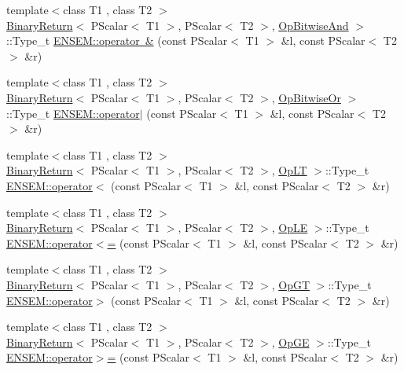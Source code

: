 \begin{DoxyCompactItemize}
\item 
{\footnotesize template$<$class T1 , class T2 $>$ }\\\mbox{\hyperlink{structBinaryReturn}{Binary\+Return}}$<$ P\+Scalar$<$ T1 $>$, P\+Scalar$<$ T2 $>$, \mbox{\hyperlink{structOpBitwiseAnd}{Op\+Bitwise\+And}} $>$\+::Type\+\_\+t \mbox{\hyperlink{group__primscalar_gadbbb42ee94a77c2df59c5a4cf78fddeb}{E\+N\+S\+E\+M\+::operator \&}} (const P\+Scalar$<$ T1 $>$ \&l, const P\+Scalar$<$ T2 $>$ \&r)
\item 
{\footnotesize template$<$class T1 , class T2 $>$ }\\\mbox{\hyperlink{structBinaryReturn}{Binary\+Return}}$<$ P\+Scalar$<$ T1 $>$, P\+Scalar$<$ T2 $>$, \mbox{\hyperlink{structOpBitwiseOr}{Op\+Bitwise\+Or}} $>$\+::Type\+\_\+t \mbox{\hyperlink{group__primscalar_ga246529f971eca0fda63267c9a68a51f7}{E\+N\+S\+E\+M\+::operator$\vert$}} (const P\+Scalar$<$ T1 $>$ \&l, const P\+Scalar$<$ T2 $>$ \&r)
\item 
{\footnotesize template$<$class T1 , class T2 $>$ }\\\mbox{\hyperlink{structBinaryReturn}{Binary\+Return}}$<$ P\+Scalar$<$ T1 $>$, P\+Scalar$<$ T2 $>$, \mbox{\hyperlink{structOpLT}{Op\+LT}} $>$\+::Type\+\_\+t \mbox{\hyperlink{group__primscalar_ga898f0000029c1749bdd5a60160848adb}{E\+N\+S\+E\+M\+::operator$<$}} (const P\+Scalar$<$ T1 $>$ \&l, const P\+Scalar$<$ T2 $>$ \&r)
\item 
{\footnotesize template$<$class T1 , class T2 $>$ }\\\mbox{\hyperlink{structBinaryReturn}{Binary\+Return}}$<$ P\+Scalar$<$ T1 $>$, P\+Scalar$<$ T2 $>$, \mbox{\hyperlink{structOpLE}{Op\+LE}} $>$\+::Type\+\_\+t \mbox{\hyperlink{group__primscalar_gadc72d49cf80f5b61a37c029861a74a5f}{E\+N\+S\+E\+M\+::operator$<$=}} (const P\+Scalar$<$ T1 $>$ \&l, const P\+Scalar$<$ T2 $>$ \&r)
\item 
{\footnotesize template$<$class T1 , class T2 $>$ }\\\mbox{\hyperlink{structBinaryReturn}{Binary\+Return}}$<$ P\+Scalar$<$ T1 $>$, P\+Scalar$<$ T2 $>$, \mbox{\hyperlink{structOpGT}{Op\+GT}} $>$\+::Type\+\_\+t \mbox{\hyperlink{group__primscalar_gac4bbd6e76f1d5dfb8c50417f131c43a0}{E\+N\+S\+E\+M\+::operator$>$}} (const P\+Scalar$<$ T1 $>$ \&l, const P\+Scalar$<$ T2 $>$ \&r)
\item 
{\footnotesize template$<$class T1 , class T2 $>$ }\\\mbox{\hyperlink{structBinaryReturn}{Binary\+Return}}$<$ P\+Scalar$<$ T1 $>$, P\+Scalar$<$ T2 $>$, \mbox{\hyperlink{structOpGE}{Op\+GE}} $>$\+::Type\+\_\+t \mbox{\hyperlink{group__primscalar_ga149cf6b2bcbe466aae6c6e90ee265c50}{E\+N\+S\+E\+M\+::operator$>$=}} (const P\+Scalar$<$ T1 $>$ \&l, const P\+Scalar$<$ T2 $>$ \&r)

\end{DoxyCompactItemize}
